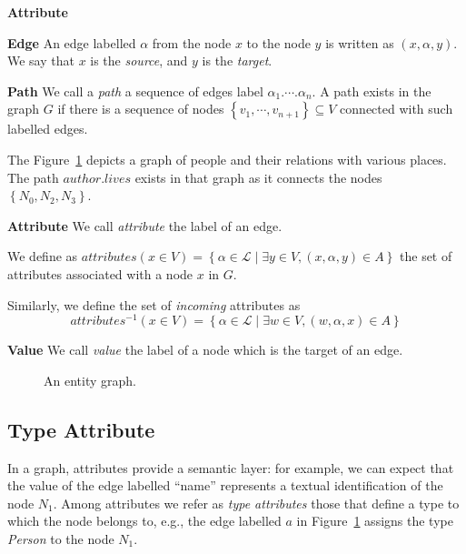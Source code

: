 \begin{labeling}{\textbf{Attribute}}
	\item[\textbf{Edge}] An edge labelled $\alpha$ from the node $x$ to the node $y$ is written as $\left(x, \alpha, y\right)$. We say that $x$ is the \emph{source}, and $y$ is the \emph{target}.

	\item[\textbf{Path}] We call a \emph{path} a sequence of edges label $\alpha_1.\cdots.\alpha_n$. A path exists in the graph $G$ if there is a sequence of nodes $\left\lbrace v_1, \cdots, v_{n+1} \right\rbrace \subseteq V$ connected with such labelled edges.

	The Figure~\ref{fig:graph} depicts a graph of people and their relations with various places. The path $author.lives$ exists in that graph as it connects the nodes $\left\lbrace N_0, N_2, N_3 \right\rbrace$.

	\item[\textbf{Attribute}] We call \emph{attribute} the label of an edge.

	We define as $attributes\left(x \in V\right) = \left\lbrace \alpha \in \mathcal{L} \mid \exists y \in V, (x, \alpha, y) \in A \right\rbrace$ the set of attributes associated with a node $x$ in $G$.

	Similarly, we define the set of \emph{incoming} attributes as
	$$
	attributes^{-1}\left(x \in V\right) = \left\lbrace \alpha \in \mathcal{L} \mid \exists w \in V, (w, \alpha, x) \in A \right\rbrace
	$$
	\item[\textbf{Value}] We call \emph{value} the label of a node which is the target of an edge.
\end{labeling}

\begin{figure}
	\centering
	\resizebox{\textwidth}{!}{
		
	}
	\caption{An entity graph.}
	\label{fig:graph}
\end{figure}

\subsection{Type Attribute}
\label{sec:ssd:type}

In a graph, attributes provide a semantic layer: for example, we can expect that the value of the edge labelled ``name'' represents a textual identification of the node $N_1$. Among attributes we refer as \emph{type attributes} those that define a type to which the node belongs to, e.g., the edge labelled $a$ in Figure~\ref{fig:graph} assigns the type \emph{Person} to the node $N_1$.

